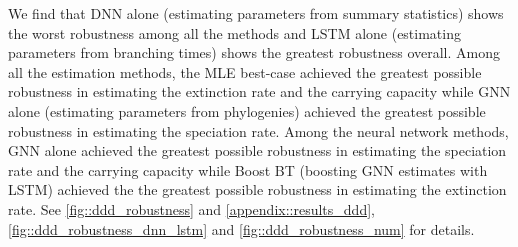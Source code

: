 {We find that DNN alone (estimating parameters from summary statistics) shows the worst robustness among all the methods and LSTM alone (estimating parameters from branching times) shows the greatest robustness overall. Among all the estimation methods, the MLE best-case achieved the greatest possible robustness in estimating the extinction rate and the carrying capacity while GNN alone (estimating parameters from phylogenies) achieved the greatest possible robustness in estimating the speciation rate. Among the neural network methods, GNN alone achieved the greatest possible robustness in estimating the speciation rate and the carrying capacity while Boost BT (boosting GNN estimates with LSTM) achieved the the greatest possible robustness in estimating the extinction rate. See \autoref{fig::ddd_robustness} and \autoref{appendix::results_ddd}, \autoref{fig::ddd_robustness_dnn_lstm} and \autoref{fig::ddd_robustness_num} for details.

}
